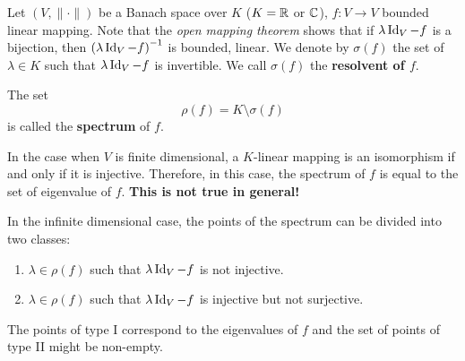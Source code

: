 \begin{definitionenv}
    Let $(V,\|\cdot\|)$ be a Banach space over $K$ ($K = \mathbb{R} $ or $\mathbb{C}$), $f:V\rightarrow V$ bounded linear mapping.
    Note that the \textit{open mapping theorem} shows that if $\lambda \operatorname{\mathrm{Id}}_{V}-f$ is a bijection, then $\left(\lambda\operatorname{\mathrm{Id}}_{V} - f\right)^{-1}$ is bounded, linear.
    We denote by $\sigma (f)$ the set of $\lambda \in K$ such that $\lambda\operatorname{\mathrm{Id}}_{V} - f$ is invertible.
    We call $\sigma(f)$ the \textbf{resolvent of $f$}.

    The set 
    $$ \rho(f) = K\setminus \sigma(f)$$
    is called the \textbf{spectrum} of $f$.
    
    \quad In the case when $V$ is finite dimensional, a $K$-linear mapping is an isomorphism if and only if it is injective.
    Therefore, in this case, the spectrum of $f$ is equal to the set of eigenvalue of $f$.
    {\bf This is not true in general!}

    \quad In the infinite dimensional case, the points of the spectrum can be divided into two classes:
    \begin{enumerate}[label= \Roman*.]
        \item $\lambda \in \rho(f)$ such that $\lambda \operatorname{\mathrm{Id}}_{V} - f$ is not injective.
        \item $\lambda \in \rho(f)$ such that $\lambda \operatorname{\mathrm{Id}}_{V} - f$ is injective but not surjective.
    \end{enumerate}
    The points of type I correspond to the eigenvalues of $f$ and the set of points of type II might be non-empty.
\end{definitionenv}

